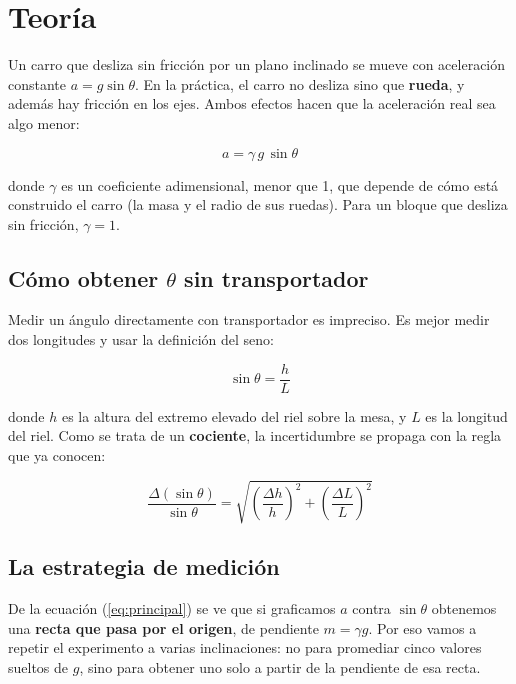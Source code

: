 \documentclass[11pt, letterpaper]{article}
\begin{document}
	\section{Teoría}
	
	Un carro que desliza sin fricción por un plano inclinado se mueve con
	aceleración constante $a = g\sin\theta$. En la práctica, el carro no desliza
	sino que \textbf{rueda}, y además hay fricción en los ejes. Ambos efectos hacen
	que la aceleración real sea algo menor:
	
	\begin{equation}
		a = \gamma\,g\,\sin\theta
		\label{eq:principal}
	\end{equation}
	
	\noindent
	donde $\gamma$ es un coeficiente adimensional, menor que 1, que depende de cómo
	está construido el carro (la masa y el radio de sus ruedas). Para un bloque que
	desliza sin fricción, $\gamma = 1$.
	
	\subsection*{Cómo obtener $\theta$ sin transportador}
	
	Medir un ángulo directamente con transportador es impreciso. Es mejor medir dos
	longitudes y usar la definición del seno:
	
	\begin{equation}
		\sin\theta = \frac{h}{L}
		\label{eq:seno}
	\end{equation}
	
	\noindent
	donde $h$ es la altura del extremo elevado del riel sobre la mesa, y $L$ es la
	longitud del riel. Como se trata de un \textbf{cociente}, la incertidumbre se
	propaga con la regla que ya conocen:
	
	\begin{equation}
		\frac{\Delta(\sin\theta)}{\sin\theta}
		= \sqrt{\left(\frac{\Delta h}{h}\right)^{2} + \left(\frac{\Delta L}{L}\right)^{2}}
		\label{eq:propaga}
	\end{equation}
	
	\subsection*{La estrategia de medición}
	
	De la ecuación (\ref{eq:principal}) se ve que si graficamos $a$ contra
	$\sin\theta$ obtenemos una \textbf{recta que pasa por el origen}, de pendiente
	$m = \gamma g$. Por eso vamos a repetir el experimento a varias inclinaciones:
	no para promediar cinco valores sueltos de $g$, sino para obtener uno solo a
	partir de la pendiente de esa recta.
	
\end{document}
